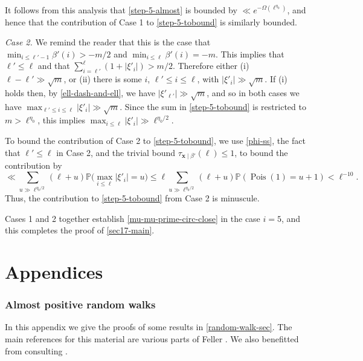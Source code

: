 \documentclass[11pt,reqno]{amsart}
\numberwithin{equation}{section}
\theoremstyle{definition}
\theoremstyle{remark}
\newcommand{\mb}{\mathbb}
\newcommand{\mbf}{\mathbf}
\newcommand\Pois{\operatorname{Pois}}
\renewcommand{\le}{\leqslant}
\begin{document}
It follows from this analysis that \cref{step-5-almost} is bounded by $\ll e^{-\Omega(\ell^{\eta_0})}$, and hence that the contribution of Case 1 to \cref{step-5-tobound} is similarly bounded.\vspace*{8pt}

\emph{Case 2.} We remind the reader that this is the case that $\min_{i \le \ell'-1} \beta'(i) > - m/2$ and $\min_{i \le \ell} \beta'(i) = -m$. This implies that $\ell' \le \ell$ and that $\sum_{i = \ell'}^{\ell} (1 + |\xi'_i|) > m/2$. Therefore either (i) $\ell - \ell' \gg \sqrt{m}$, or (ii) there is some $i$, $\ell' \le i \le \ell$, with $|\xi'_i| \gg \sqrt{m}$. If (i) holds then, by \cref{ell-dash-and-ell}, we have $|\xi'_{\ell'}| \gg \sqrt{m}$, and so in both cases we have $\max_{\ell' \le i \le \ell} |\xi'_i| \gg \sqrt{m}$. Since the sum in \cref{step-5-tobound} is restricted to $m > \ell^{\eta_0}$, this implies $\max_{i \le \ell} |\xi'_i| \gg \ell^{\eta_0/2}$.

To bound the contribution of Case 2 to \cref{step-5-tobound}, we use \cref{phi-ss}, the fact that $\ell' \le \ell$ in Case 2, and the trivial bound $\tau_{\mbf{x} \mid \beta'}(\ell) \le 1$, to bound the contribution by 
\[ \ll \sum_{u\gg \ell^{\eta_0/2}}(\ell + u) \mb{P}\big(\max_{i \le \ell} |\xi'_i| = u\big) \le \ell \sum_{u\gg \ell^{\eta_0/2}}(\ell + u) \mb{P}( \Pois(1)  = u + 1) < \ell^{-10}. \]
Thus, the contribution to \cref{step-5-tobound} from Case 2 is minuscule.


Cases 1 and 2 together establish \cref{mu-mu-prime-circ-close} in the case $i = 5$, and this completes the proof of \cref{sec17-main}.


\vspace*{10pt}



\vspace*{10pt}

\part*{Appendices}

\appendix

\section{Almost positive random walks}\label{poisson-app} 

In this appendix we give the proofs of some results in \cref{random-walk-sec}. The main references for this material are various parts of Feller \cite{feller2}. We also benefitted from consulting \cite[Section 2]{aidekon-shi}. 
\end{document}
